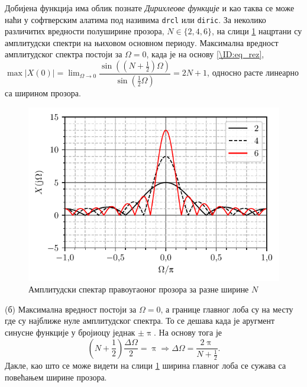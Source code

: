 Добијена функција има облик познате \textit{Дирихлеове функције} и као таква се може наћи у софтверским  
алатима под називима \texttt{drcl} или \texttt{diric}. За неколико различитих вредности полуширине прозора, 
$N \in \{2,4,6\}$, на слици \ref{fig:\ID.varn} нацртани су амплитудски спектри на њиховом 
основном периоду. Максимална вредност амплитудског спектра постоји за $\Omega = 0$, када је на 
основу \eqref{\ID:eq_rez}, 
$\max |X(0)| = \lim_{\Omega \to 0}  \dfrac{\sin \left( \left(N + \frac12\right) \Omega \right) }{ \sin \left(  \frac12 \Omega \right)} 
= 2N + 1$, односно расте линеарно са ширином прозора.
\begin{figure}
    \centering
    \includegraphics{fig/rec_spect_varn.pdf}
    \caption{Амплитудски спектар правоугаоног прозора за разне ширине $N$}
    \label{fig:\ID.varn}
\end{figure}

(б) Максимална вредност постоји за $\Omega = 0$, а границе главног лоба су на месту где су најближе 
нуле амплитудског спектра. То се дешава када је аругмент синусне функције у бројиоцу једнак $\pm \uppi$. 
На основу тога је 
\begin{equation}
    \left( N + \dfrac{1}{2} \right) \dfrac{\Delta \Omega}{2} = \uppi 
    \Rightarrow
    \Delta \Omega = \dfrac{2 \uppi}{N + \frac{1}{2}}.
\end{equation}
Дакле, као што се може видети на слици \ref{fig:\ID.varn} ширина главног лоба се сужава са повећањем ширине прозора. \\